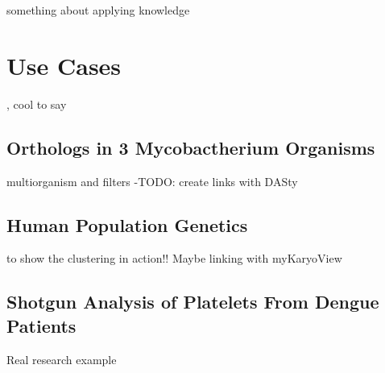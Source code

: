 \begin{savequote}[75mm] 
something about applying knowledge
\end{savequote}

\chapter{Use Cases}

, cool to say

\section{Orthologs in 3 Mycobactherium Organisms}
multiorganism and filters -TODO: create links with DASty

\section{Human Population Genetics}
to show the clustering in action!! Maybe linking with myKaryoView

\section{Shotgun Analysis of Platelets From Dengue Patients}
Real research example